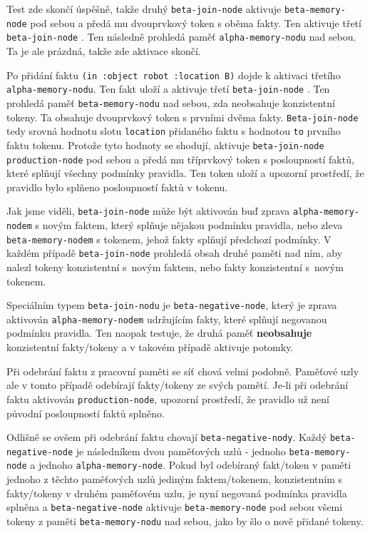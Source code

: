 Test zde skončí úspěšně, takže druhý \verb|beta-join-node| aktivuje
\verb|beta-memory-node| pod sebou a předá mu dvouprvkový token s oběma fakty.
Ten aktivuje třetí \verb|beta-join-node| . Ten následně prohledá paměť
\verb|alpha-memory-nodu| nad sebou. Ta je ale prázdná, takže zde aktivace
skončí.

Po přidání faktu \verb|(in :object robot :location B)| dojde k aktivaci třetího
\verb|alpha-memory-nodu|. Ten fakt uloží a aktivuje třetí \verb|beta-join-node|
. Ten prohledá paměť \verb|beta-memory-nodu| nad sebou, zda
neobsahuje konzistentní tokeny. Ta obsahuje dvouprvkový token s prvními dvěma
fakty. \verb|Beta-join-node| tedy srovná hodnotu slotu \verb|location| přidaného
faktu s hodnotou \verb|to| prvního faktu tokenu. Protože tyto hodnoty se
shodují, aktivuje \verb|beta-join-node| \verb|production-node| pod sebou a předá
mu tříprvkový token s posloupností faktů, které splňují všechny podmínky
pravidla. Ten token uloží a upozorní prostředí, že pravidlo bylo splňeno
posloupností faktů v tokenu.

Jak jsme viděli, \verb|beta-join-node| může být aktivován buď zprava
\verb|alpha-memory-nodem| s novým faktem, který splňuje nějakou podmínku
pravidla, nebo zleva \verb|beta-memory-nodem| s tokenem, jehož fakty splňují
předchozí podmínky. V každém případě \verb|beta-join-node| prohledá obsah druhé
paměti nad ním, aby nalezl tokeny konzistentní s~novým faktem, nebo fakty
konzistentní s~novým tokenem.

Speciálním typem \verb|beta-join-nodu| je \verb|beta-negative-node|, který je
zprava aktivován \verb|alpha-memory-nodem| udržujícím fakty, které splňují
negovanou podmínku pravidla. Ten naopak testuje, že druhá paměť
\textbf{neobsahuje} konzistentní fakty/tokeny a v takovém případě aktivuje
potomky.

Při odebrání faktu z pracovní paměti se síť chová velmi podobně. Paměťové uzly
ale v tomto případě odebírají fakty/tokeny ze svých pamětí.
Je-li při odebrání faktu aktivován \verb|production-node|, upozorní prostředí,
že pravidlo už není původní posloupností faktů splněno.

Odlišně se ovšem při odebrání faktu chovají \verb|beta-negative-nody|. Každý
\verb|beta-negative-node| je následníkem dvou paměťových uzlů - jednoho
\verb|beta-memory-node| a jednoho \verb|alpha-memory-node|.  Pokud byl odebíraný
fakt/token v paměti jednoho z těchto paměťových uzlů jediným faktem/tokenem,
konzistentním s fakty/tokeny v druhém paměťovém uzlu, je nyní negovaná podmínka
pravidla splněna a \verb|beta-negative-node| aktivuje \verb|beta-memory-node|
pod sebou všemi tokeny z paměti \verb|beta-memory-nodu| nad sebou, jako by šlo o
nově přidané tokeny.

